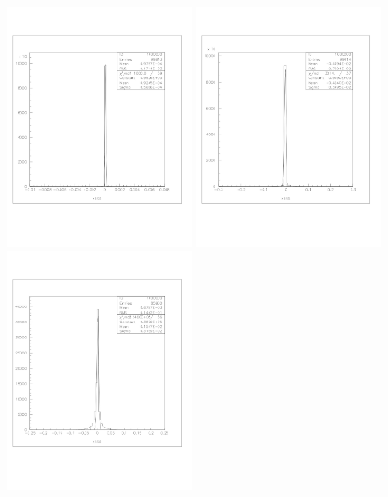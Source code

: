 \documentclass[a4paper]{article}
\begin{document}
\begin{figure}[!htb]
  \centering
  \includegraphics[width=0.49\textwidth]{ex_images/1_100_010_xs.jpg}
  \includegraphics[width=0.49\textwidth]{ex_images/1_100_030_xs.jpg}
  \includegraphics[width=0.49\textwidth]{ex_images/1_100_050_xs.jpg}

\end{figure}
\end{document}
